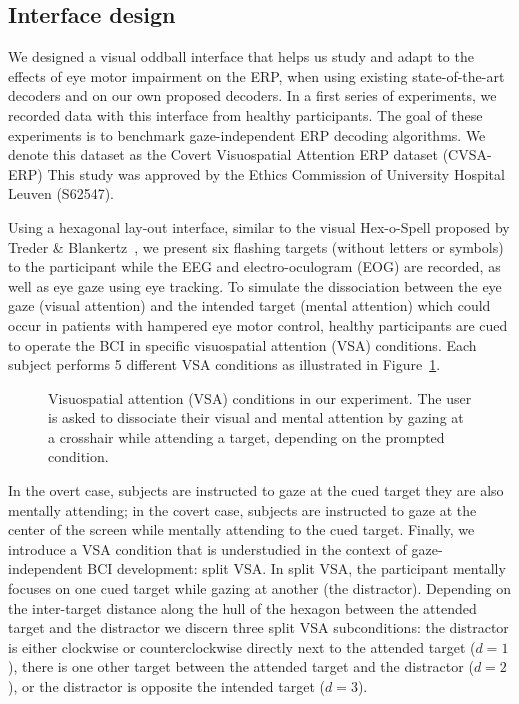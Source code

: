 \subsection{Interface design}
We designed a visual oddball interface that helps us study and adapt
to the effects of eye motor impairment on the ERP, when using existing state-of-the-art
decoders and on our own proposed decoders.
In a first series of experiments, we recorded data with this interface from healthy participants.
The goal of these experiments is to benchmark
gaze-independent ERP decoding algorithms.
We denote this dataset as the Covert Visuospatial Attention ERP dataset
(CVSA-ERP)
This study was approved by the Ethics Commission of University Hospital Leuven
(S62547).

Using a hexagonal lay-out interface, similar to the visual Hex-o-Spell proposed
by Treder \& Blankertz~\cite{Treder2010}, we present six flashing targets (without letters or
symbols) to the participant while the EEG and electro-oculogram (EOG) are
recorded, as well as eye gaze using eye tracking.
To simulate the dissociation between the eye gaze (visual attention) and the
intended target (mental attention) which could occur in patients with hampered eye
motor control, healthy participants are cued to operate the BCI in specific
visuospatial attention (VSA) conditions.
Each subject performs 5 different VSA conditions as illustrated in
Figure~\ref{fig:vsa-conditions}.
\begin{figure}
	\caption{Visuospatial attention (VSA) conditions in our experiment. The user is
		asked to dissociate their visual and mental attention by gazing at a
		crosshair while attending a target, depending on the prompted condition.}%
	\label{fig:vsa-conditions}
\end{figure}
In the overt case, subjects are instructed to gaze at the cued
target they are also mentally attending; in the covert case, subjects are instructed
to gaze at the center of the screen while mentally attending to the cued target.
Finally, we introduce a VSA condition that is understudied in the context of
gaze-independent BCI development: split VSA.
In split VSA, the participant mentally focuses on one cued target while gazing at
another (the distractor).
Depending on the inter-target distance along the hull of the hexagon between the
attended target and the distractor we discern three split VSA subconditions:
the distractor is either clockwise or counterclockwise directly next to the
attended target ($d=1$), there is one other target between the attended target and
the distractor ($d=2$), or the distractor is opposite the intended target
($d=3$).


